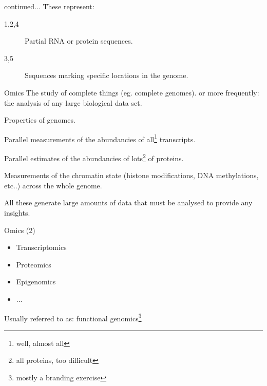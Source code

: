 \documentclass[pdf]{beamer}
\begin{document}
\begin{frame}{continued...}
  These represent:
  \begin{description}
  \item[1,2,4] Partial RNA or protein sequences.
  \item[3,5] Sequences marking specific locations in the genome.
    
  \end{description}
\end{frame}

\begin{frame}{Omics}
  The study of complete things (eg. complete genomes).
  \pause
  or more frequently:\\
  \hspace{2em}the analysis of any large biological data set.
  \pause
  \begin{description}[Transcriptomics]
  \item[Genomics] Properties of genomes.
  \item[Transcriptomics] Parallel measurements of the abundancies of all\footnote{well, almost all} transcripts.
  \item[Proteomics] Parallel estimates of the abundancies of lots\footnote{all proteins, too difficult} of proteins.
  \item[epigenomics?] Measurements of the chromatin state (histone modifications, DNA methylations, etc..) across the whole genome.
  \end{description}
  All these generate large amounts of data that must be analysed to provide
  any insights.

\end{frame}

\begin{frame}{Omics (2)}
  \begin{itemize}
    \item Transcriptomics
    \item Proteomics
    \item Epigenomics
    \item ...
  \end{itemize}
  Usually referred to as:
  functional genomics\footnote{mostly a branding exercise}

\end{frame}
\end{document}
